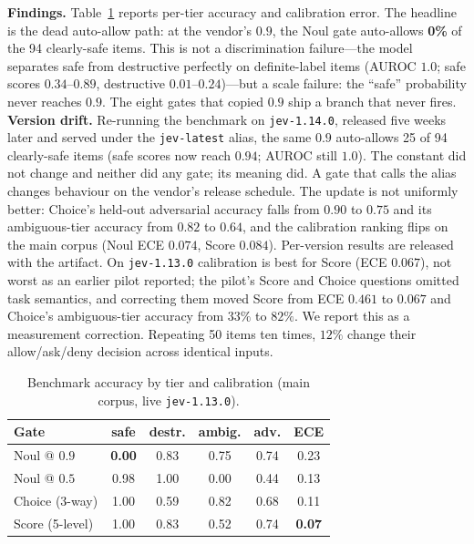 \documentclass[conference]{IEEEtran}
\newcommand{\code}[1]{\texttt{\small #1}}
\begin{document}
\textbf{Findings.} Table~\ref{tab:bench} reports per-tier accuracy and calibration error.
The headline is the dead auto-allow path: at the vendor's $0.9$, the Noul gate auto-allows
\textbf{0\%} of the 94 clearly-safe items. This is not a discrimination failure---the model
separates safe from destructive perfectly on definite-label items (AUROC $1.0$; safe scores
$0.34$--$0.89$, destructive $0.01$--$0.24$)---but a scale failure: the ``safe'' probability
never reaches $0.9$. The eight gates that copied $0.9$ ship a branch that never fires.
\textbf{Version drift.} Re-running the benchmark on \code{jev-1.14.0}, released five weeks
later and served under the \code{jev-latest} alias, the same $0.9$ auto-allows 25 of 94
clearly-safe items (safe scores now reach $0.94$; AUROC still $1.0$). The constant did not
change and neither did any gate; its meaning did. A gate that calls the alias changes
behaviour on the vendor's release schedule. The update is not uniformly better: Choice's
held-out adversarial accuracy falls from $0.90$ to $0.75$ and its ambiguous-tier accuracy
from $0.82$ to $0.64$, and the calibration ranking flips on the main corpus (Noul ECE
$0.074$, Score $0.084$). Per-version results are released with the artifact.
On \code{jev-1.13.0} calibration is best for Score (ECE $0.067$), not worst as an earlier pilot reported; the
pilot's Score and Choice questions omitted task semantics, and correcting them moved Score
from ECE $0.461$ to $0.067$ and Choice's ambiguous-tier accuracy from $33\%$ to $82\%$. We
report this as a measurement correction. Repeating 50 items ten times, $12\%$ change their
allow/ask/deny decision across identical inputs.

\begin{table}[t]
\caption{Benchmark accuracy by tier and calibration (main corpus, live \code{jev-1.13.0}).}
\label{tab:bench}
\centering\small
\begin{tabular}{@{}lccccc@{}}
\toprule
Gate & safe & destr. & ambig. & adv. & ECE \\
\midrule
Noul @ $0.9$ & \textbf{0.00} & 0.83 & 0.75 & 0.74 & 0.23 \\
Noul @ $0.5$ & 0.98 & 1.00 & 0.00 & 0.44 & 0.13 \\
Choice (3-way) & 1.00 & 0.59 & 0.82 & 0.68 & 0.11 \\
Score (5-level) & 1.00 & 0.83 & 0.52 & 0.74 & \textbf{0.07} \\
\bottomrule
\end{tabular}
\end{table}
\end{document}

